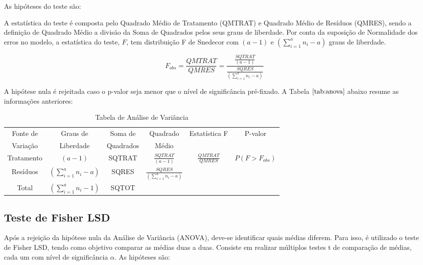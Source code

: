 \documentclass[
]{estat/estat}
\begin{document}
As hipóteses do teste são:


A estatística do teste é composta pelo Quadrado Médio de Tratamento
(QMTRAT) e Quadrado Médio de Resíduos (QMRES), sendo a definição de
Quadrado Médio a divisão da Soma de Quadrados pelos seus graus de
liberdade. Por conta da suposição de Normalidade dos erros no modelo, a
estatística do teste, \(F\), tem distribuição F de Snedecor com
\((a - 1)\) e \((\sum_{i=1}^a n_i - a)\) graus de liberdade.

\[
F_{obs} = \frac{QMTRAT}{QMRES} = \frac{\frac{SQTRAT}{(a-1)}}{\frac{SQRES}{(\sum_{i=1}^a n_i - a)}}
\]

A hipótese nula é rejeitada caso o p-valor seja menor que o nível de
significância pré-fixado. A Tabela \(\ref{tab:anova}\) abaixo resume as
informações anteriores:

\begin{table}[H]
\centering
\caption{Tabela de Análise de Variância}
\begin{tabular}{c | c c c c c}
    \toprule 
    Fonte de & Graus de  & Soma de  & Quadrado  & \multirow{2}{*}{Estatística F} & \multirow{2}{*}{P-valor} \\ 
    Variação & Liberdade & Quadrados & Médio & & \\
    \midrule
    Tratamento & $(a-1)$ & SQTRAT & $\frac{SQTRAT}{(a-1)}$ & $\frac{QMTRAT}{QMRES}$ & $P(F>F_{obs})$ \\[5pt]
    Resíduos & $(\sum_{i=1}^a n_i - a)$ & SQRES & $\frac{SQRES}{(\sum_{i=1}^a n_i - a)}$ & & \\ 
    \midrule
    Total & $(\sum_{i=1}^a n_i - 1)$ & SQTOT & & & \\ 
    \bottomrule
\end{tabular}

\end{table}

\hypertarget{teste-de-fisher-lsd}{%
\subsection{Teste de Fisher LSD}\label{teste-de-fisher-lsd}}

Após a rejeição da hipótese nula da Análise de Variância (ANOVA),
deve-se identificar quais médias diferem. Para isso, é utilizado o teste
de Fisher LSD, tendo como objetivo comparar as médias duas a duas.
Consiste em realizar múltiplos testes t de comparação de médias, cada um
com nível de significância \(\alpha\). As hipóteses são:
\end{document}
